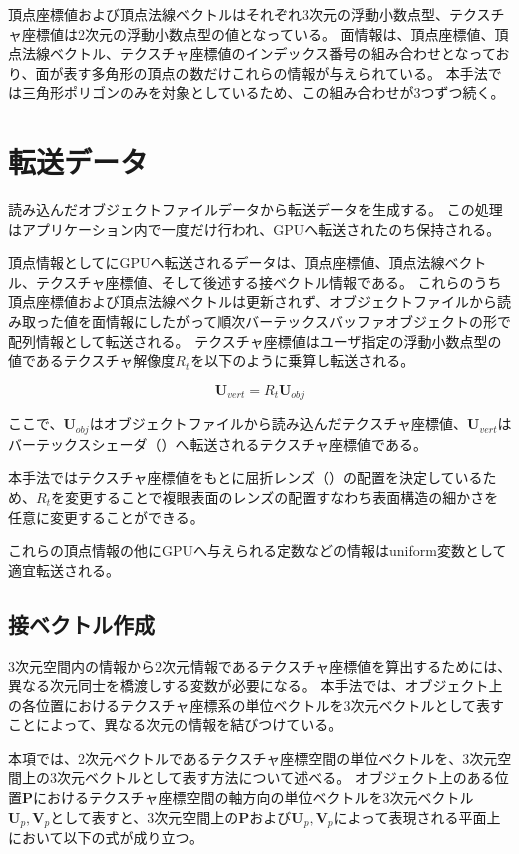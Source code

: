 頂点座標値および頂点法線ベクトルはそれぞれ3次元の浮動小数点型、テクスチャ座標値は2次元の浮動小数点型の値となっている。
面情報は、頂点座標値、頂点法線ベクトル、テクスチャ座標値のインデックス番号の組み合わせとなっており、面が表す多角形の頂点の数だけこれらの情報が与えられている。
本手法では三角形ポリゴンのみを対象としているため、この組み合わせが3つずつ続く。

\section{転送データ}
\label{SObjfile}

読み込んだオブジェクトファイルデータから転送データを生成する。
この処理はアプリケーション内で一度だけ行われ、GPUへ転送されたのち保持される。


頂点情報としてにGPUへ転送されるデータは、頂点座標値、頂点法線ベクトル、テクスチャ座標値、そして後述する接ベクトル情報である。
これらのうち頂点座標値および頂点法線ベクトルは更新されず、オブジェクトファイルから読み取った値を面情報にしたがって順次バーテックスバッファオブジェクトの形で配列情報として転送される。
テクスチャ座標値はユーザ指定の浮動小数点型の値であるテクスチャ解像度$R_{t}$を以下のように乗算し転送される。

\begin{equation}
{\bm U_{vert}} = R_{t}{\bm U_{obj}}
\end{equation}

\noindent
ここで、$\bm{U}_{obj}$はオブジェクトファイルから読み込んだテクスチャ座標値、$\bm{U}_{vert}$はバーテックスシェーダ（\secref{}）へ転送されるテクスチャ座標値である。

本手法ではテクスチャ座標値をもとに屈折レンズ（）の配置を決定しているため、$R_{t}$を変更することで複眼表面のレンズの配置すなわち表面構造の細かさを任意に変更することができる。

これらの頂点情報の他にGPUへ与えられる定数などの情報はuniform変数として適宜転送される。

\subsection{接ベクトル作成}
\label{SSTangent}

3次元空間内の情報から2次元情報であるテクスチャ座標値を算出するためには、異なる次元同士を橋渡しする変数が必要になる。
本手法では、オブジェクト上の各位置におけるテクスチャ座標系の単位ベクトルを3次元ベクトルとして表すことによって、異なる次元の情報を結びつけている。

本項では、2次元ベクトルであるテクスチャ座標空間の単位ベクトルを、3次元空間上の3次元ベクトルとして表す方法について述べる。
オブジェクト上のある位置$\bm{P}$におけるテクスチャ座標空間の軸方向の単位ベクトルを3次元ベクトル$\bm{U}_{p}, \bm{V}_{p}$として表すと、3次元空間上の$\bm{P}$および$\bm{U}_{p}, \bm{V}_{p}$によって表現される平面上において以下の式が成り立つ。

